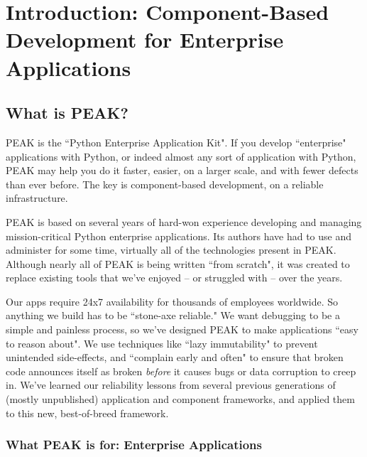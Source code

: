 \chapter{Introduction: Component-Based Development for Enterprise Applications}

\section{What is PEAK?}

PEAK is the ``Python Enterprise Application Kit". If you develop
``enterprise" applications with Python, or indeed almost any sort of
application with Python, PEAK may help you do it faster, easier, on a
larger scale, and with fewer defects than ever before. The key is
component-based development, on a reliable infrastructure. 

PEAK is based on several years of hard-won experience developing and
managing mission-critical Python enterprise applications. Its authors
have had to use and administer for some time, virtually all of the
technologies present in PEAK. Although nearly all of PEAK is being
written ``from scratch", it was created to replace existing tools that
we've enjoyed -- or struggled with -- over the years. 

Our apps require 24x7 availability for thousands of employees worldwide.
So anything we build has to be ``stone-axe reliable." We want debugging
to be a simple and painless process, so we've designed PEAK to make
applications ``easy to reason about". We use techniques like ``lazy
immutability" to prevent unintended side-effects, and ``complain early
and often" to ensure that broken code announces itself as broken
\emph{before} it causes bugs or data corruption to creep in.  We've learned
our reliability lessons from several previous generations of (mostly
unpublished) application and component frameworks, and applied them to
this new, best-of-breed framework. 














\subsection{What PEAK is for: Enterprise Applications} 

